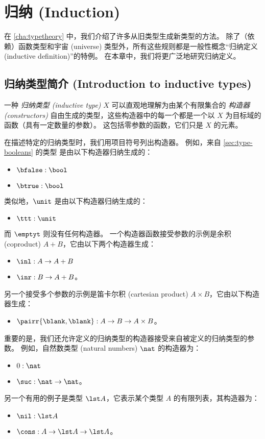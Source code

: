 \chapter{归纳 (Induction)}
\label{cha:induction}

在 \cref{cha:typetheory} 中，我们介绍了许多从旧类型生成新类型的方法。
除了（依赖）函数类型和宇宙 (universe) 类型外，所有这些规则都是一般性概念“归纳定义 (inductive definition)”的特例。
在本章中，我们将更广泛地研究归纳定义。

\section{归纳类型简介 (Introduction to inductive types)}
\label{sec:bool-nat}

%
一种 \emph{归纳类型 (inductive type)} $X$ 可以直观地理解为由某个有限集合的 \emph{构造器 (constructors)} 自由生成的类型，这些构造器中的每一个都是一个以 $X$ 为目标域的函数（具有一定数量的参数）。
这包括零参数的函数，它们只是 $X$ 的元素。

在描述特定的归纳类型时，我们用项目符号列出构造器。
例如，来自 \cref{sec:type-booleans} 的类型 \bool 是由以下构造器归纳生成的：
\begin{itemize}
    \item $\bfalse:\bool$
    \item $\btrue:\bool$
\end{itemize}
类似地，$\unit$ 是由以下构造器归纳生成的：
\begin{itemize}
    \item $\ttt:\unit$
\end{itemize}
而 $\emptyt$ 则没有任何构造器。
一个构造器函数接受参数的示例是余积 (coproduct) $A+B$，它由以下两个构造器生成：
\begin{itemize}
    \item $\inl:A\to A+B$
    \item $\inr:B\to A+B$。
\end{itemize}
另一个接受多个参数的示例是笛卡尔积 (cartesian product) $A\times B$，它由以下构造器生成：
\begin{itemize}
    \item $\pairr{\blank, \blank} : A\to B \to A\times B$。
\end{itemize}
重要的是，我们还允许定义的归纳类型的构造器接受来自被定义的归纳类型的参数。
例如，自然数类型 (natural numbers) $\nat$ 的构造器为：
\begin{itemize}
    \item $0:\nat$
    \item $\suc:\nat\to\nat$。
\end{itemize}
%
%
另一个有用的例子是类型 $\lst A$，它表示某个类型 $A$ 的有限列表，其构造器为：
\begin{itemize}\label{list_constructors}
\item $\nil:\lst A$
\item $\cons:A\to \lst A \to \lst A$。
\end{itemize}

